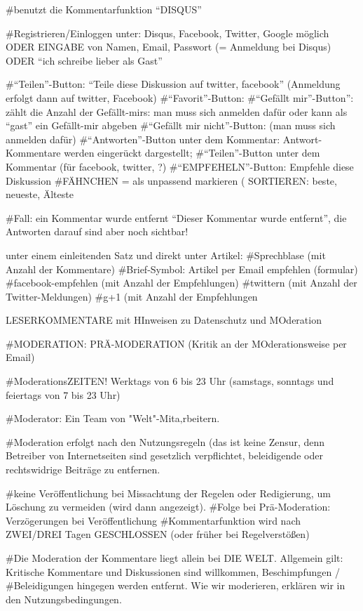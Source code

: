#benutzt die Kommentarfunktion ``DISQUS''

#Registrieren/Einloggen unter: Disqus, Facebook, Twitter, Google möglich ODER EINGABE von Namen, Email, Passwort (= Anmeldung bei Disqus) ODER ``ich schreibe lieber als Gast''

#``Teilen''-Button: ``Teile diese Diskussion auf twitter, facebook'' (Anmeldung erfolgt dann auf twitter, Facebook)
#``Favorit''-Button: 
#``Gefällt mir''-Button'': zählt die Anzahl der Gefällt-mirs: man muss sich anmelden dafür oder kann als ``gast'' ein Gefällt-mir abgeben
#``Gefällt mir nicht''-Button: (man muss sich anmelden dafür)
#``Antworten''-Button unter dem Kommentar: Antwort-Kommentare werden eingerückt dargestellt; 
#``Teilen''-Button unter dem Kommentar (für facebook, twitter, ?)
#``EMPFEHELN''-Button: Empfehle diese Diskussion
#FÄHNCHEN = als unpassend markieren (
 SORTIEREN: beste, neueste, Älteste

#Fall: ein Kommentar wurde entfernt ``Dieser Kommentar wurde entfernt'', die Antworten darauf sind aber noch sichtbar!

unter einem einleitenden Satz und direkt unter Artikel:
#Sprechblase (mit Anzahl der Kommentare)
#Brief-Symbol: Artikel per Email empfehlen (formular)
#facebook-empfehlen (mit Anzahl der Empfehlungen)
#twittern (mit Anzahl der Twitter-Meldungen)
#g+1 (mit Anzahl der Empfehlungen



LESERKOMMENTARE mit HInweisen zu Datenschutz und MOderation


#MODERATION: PRÄ-MODERATION (Kritik an der MOderationsweise per Email)

#ModerationsZEITEN! Werktags von 6 bis 23 Uhr (samstags, sonntags und feiertags von 7 bis 23 Uhr)

#Moderator: Ein Team von "Welt"-Mita‚rbeitern.

#Moderation erfolgt nach den Nutzungsregeln (das ist keine Zensur, denn Betreiber von Internetseiten sind gesetzlich verpflichtet, beleidigende oder rechtswidrige Beiträge zu entfernen.


#keine Veröffentlichung bei Missachtung der Regelen oder Redigierung, um Löschung zu vermeiden (wird dann angezeigt).
#Folge bei Prä-Moderation: Verzögerungen bei Veröffentlichung
#Kommentarfunktion wird nach ZWEI/DREI Tagen GESCHLOSSEN (oder früher bei Regelverstößen)


#Die Moderation der Kommentare liegt allein bei DIE WELT. Allgemein gilt: Kritische Kommentare und Diskussionen sind willkommen, Beschimpfungen / #Beleidigungen hingegen werden entfernt. Wie wir moderieren, erklären wir in den Nutzungsbedingungen. 


